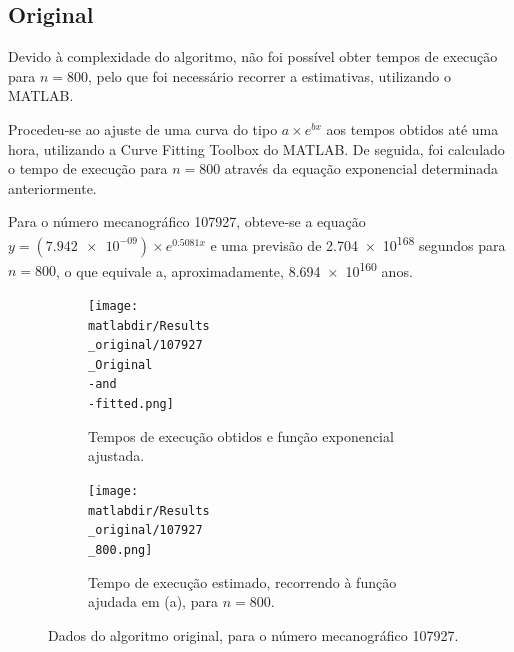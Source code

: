 \documentclass[portuguese,11pt,a4paper,titlepage]{article}
\newcommand{\matlabdir}{"../MATLAB-fittings"}
\begin{document}
\subsection{Original}
Devido à complexidade do algoritmo, não foi possível obter tempos de execução para \begin{math}n = 800\end{math},
pelo que foi necessário recorrer a estimativas, utilizando o MATLAB.

Procedeu-se ao ajuste de uma curva do tipo \begin{math}a\times e^{bx}\end{math}
aos tempos obtidos até uma hora, utilizando a Curve Fitting Toolbox do MATLAB.
De seguida, foi calculado o tempo de execução para \begin{math}n = 800\end{math}
através da equação exponencial determinada anteriormente.

Para o número mecanográfico 107927, obteve-se a equação \begin{math}y = (\num{7.942e-09})\times e^{0.5081x}\end{math}
e uma previsão de \num{2.704e+168} segundos para \begin{math}n = 800\end{math}, o que equivale a, aproximadamente, \num{8.694e+160} anos.

\begin{figure}[h]
	\begin{subfigure}{0.47\textwidth}
	\texttt{[image: \\matlabdir/Results\\\_original/107927\\\_Original\\-and\\-fitted.png]} 
	\caption{Tempos de execução obtidos e função exponencial ajustada.}
	\label{fig:subim1}
	\end{subfigure}
	\hspace{0.049\textwidth}
	\begin{subfigure}{0.47\textwidth}
	\texttt{[image: \\matlabdir/Results\\\_original/107927\\\_800.png]}
	\caption{Tempo de execução estimado, recorrendo à função ajudada em (a), para \begin{math}n=800\end{math}.}
	\label{fig:original_800}
	\end{subfigure}
	
	\caption{Dados do algoritmo original, para o número mecanográfico 107927.}
	\label{fig:original107927}
\end{figure}
\end{document}
